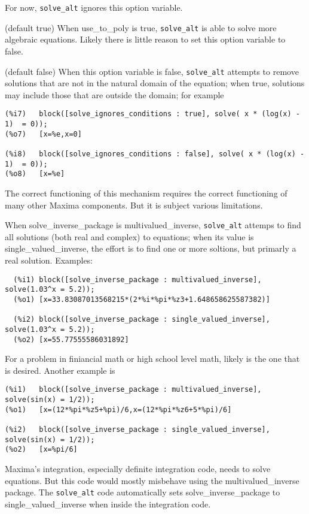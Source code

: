 \documentclass[]{scrartcl}
\newcommand{\altsolve}{\texttt{solve\_alt}}
\begin{document}
\begin{description}
For now, \altsolve \/ ignores this option variable.

\item [use\_to\_poly] (default true)  When use\_to\_poly is true, \altsolve\/ is able to solve
more algebraic equations.  Likely there is little reason to set this option variable to false.

\item[solve\_ignores\_conditions] (default false) When this option variable is false, \altsolve\/
attempts to remove solutions that are not in the natural domain of the equation; when true,
solutions may include those that are outside the domain; for example
\begin{verbatim}
(%i7)	block([solve_ignores_conditions : true], solve( x * (log(x) - 1)  = 0));
(%o7)	[x=%e,x=0]

(%i8)	block([solve_ignores_conditions : false], solve( x * (log(x) - 1)  = 0));
(%o8)	[x=%e]
\end{verbatim}

The correct functioning of this mechanism requires the correct functioning of many other Maxima components. But it is subject various limitations.

\item[solve\_inverse\_package] When solve\_inverse\_package is multivalued\_inverse, \altsolve\/
attemps to find all solutions (both real and complex) to equations; when its value is
single\_valued\_inverse, the effort is to find one or more soltions, but primarly a real solution.
Examples:
\begin{verbatim}
  (%i1)	block([solve_inverse_package : multivalued_inverse], solve(1.03^x = 5.2));
  (%o1)	[x=33.83087013568215*(2*%i*%pi*%z3+1.648658625587382)]

  (%i2)	block([solve_inverse_package : single_valued_inverse], solve(1.03^x = 5.2));
  (%o2)	[x=55.77555586031892]
\end{verbatim}
For a problem in finiancial math or high school level math, likely is the one that is desired. Another
example is
\begin{verbatim}
(%i1)	block([solve_inverse_package : multivalued_inverse], solve(sin(x) = 1/2));
(%o1)	[x=(12*%pi*%z5+%pi)/6,x=(12*%pi*%z6+5*%pi)/6]

(%i2)	block([solve_inverse_package : single_valued_inverse], solve(sin(x) = 1/2));
(%o2)	[x=%pi/6]
\end{verbatim}

Maxima's integration, especially definite integration code, needs to solve equations. But
this code would mostly misbehave using the  multivalued\_inverse package. The \altsolve\/
code automatically sets solve\_inverse\_package to single\_valued\_inverse when inside
the integration code.

\end{description}
\end{document}
